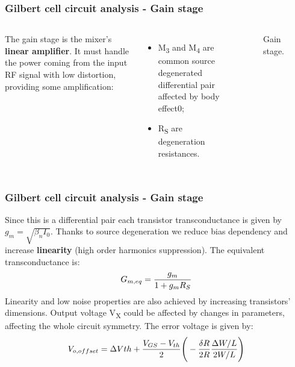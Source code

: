 \begin{frame}
	\frametitle{Gilbert cell circuit analysis - Gain stage}
	\begin{columns} [c]
		The gain stage is the mixer's \textbf{linear amplifier}. It must handle the power coming from the input RF signal with low distortion, providing some amplification:
		\begin{itemize}
			\item M\textsubscript{3} and M\textsubscript{4} are common source degenerated differential pair affected by body effect0;
			\item R\textsubscript{S} are degeneration resistances.	
		\end{itemize}
		\begin{figure}[H]
			\centering
			\caption{Gain stage.}
			\label{fig:GainStage}
		\end{figure}
	\end{columns}
\end{frame}


\begin{frame}
	\frametitle{Gilbert cell circuit analysis - Gain stage}
	Since this is a differential pair each transistor transconductance is given by $g_m = \sqrt{\beta_{n}I_0}$. Thanks to source degeneration we reduce bias dependency and  increase \textbf{linearity} (high order harmonics suppression). The equivalent transconductance is: 
	\begin{equation}
	\label{eq_degenGain}
	G_{m,eq} = \frac{g_m}{1+g_m R_S} \notag
	\end{equation}
	Linearity and low noise properties are also achieved by increasing transistors' dimensions.
	Output voltage V\textsubscript{X} could be affected by changes in parameters, affecting the whole circuit symmetry. The error voltage is given by:
	\begin{equation}
	V_{o,offset}= \Delta V{th}+\frac{V_{GS}-V_{th}}{2}\Bigg(-\frac{\delta R}{2R}\frac{\Delta W /L}{2W/L}\Bigg) \notag
	\end{equation}
\end{frame}

